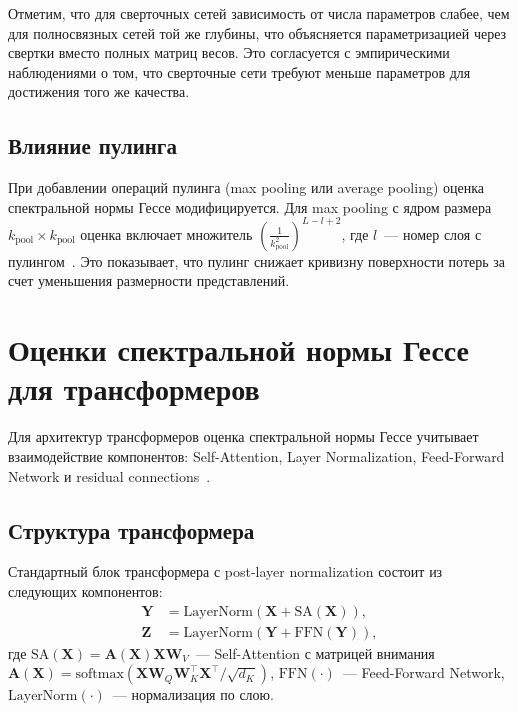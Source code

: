 Отметим, что для сверточных сетей зависимость от числа параметров слабее, чем для полносвязных сетей той же глубины, что объясняется параметризацией через свертки вместо полных матриц весов. Это согласуется с эмпирическими наблюдениями о том, что сверточные сети требуют меньше параметров для достижения того же качества.

\subsection{Влияние пулинга}

При добавлении операций пулинга (max pooling или average pooling) оценка спектральной нормы Гессе модифицируется. Для max pooling с ядром размера $k_{\text{pool}} \times k_{\text{pool}}$ оценка включает множитель $\left(\frac{1}{k_{\text{pool}}^2}\right)^{L-l+2}$, где $l$~--- номер слоя с пулингом~\cite{meshkov2024convnets}. Это показывает, что пулинг снижает кривизну поверхности потерь за счет уменьшения размерности представлений.

\section{Оценки спектральной нормы Гессе для трансформеров}

Для архитектур трансформеров оценка спектральной нормы Гессе учитывает взаимодействие компонентов: Self-Attention, Layer Normalization, Feed-Forward Network и residual connections~\cite{kiselev2024transformers}.

\subsection{Структура трансформера}

Стандартный блок трансформера с post-layer normalization состоит из следующих компонентов:
\begin{align}
\mathbf{Y} &= \text{LayerNorm}(\mathbf{X} + \text{SA}(\mathbf{X})), \label{eq:transformer-mid} \\
\mathbf{Z} &= \text{LayerNorm}(\mathbf{Y} + \text{FFN}(\mathbf{Y})), \label{eq:transformer-out}
\end{align}
где $\text{SA}(\mathbf{X}) = \mathbf{A}(\mathbf{X}) \mathbf{X} \mathbf{W}_V$~--- Self-Attention с матрицей внимания $\mathbf{A}(\mathbf{X}) = \text{softmax}(\mathbf{X} \mathbf{W}_Q \mathbf{W}_K^\top \mathbf{X}^\top / \sqrt{d_K})$, $\text{FFN}(\cdot)$~--- Feed-Forward Network, $\text{LayerNorm}(\cdot)$~--- нормализация по слою.

